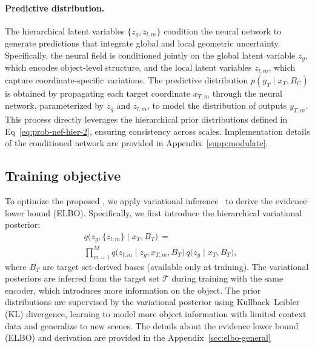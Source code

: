\paragraph{Predictive distribution.}
The hierarchical latent variables \( \{{z}_g, {z}_{l,m}\} \) condition the neural network to generate predictions that integrate global and local geometric uncertainty. Specifically, the neural field is conditioned jointly on the global latent variable \( {z}_g \), which encodes object-level structure, and the local latent variables \( {z}_{l,m} \), which capture coordinate-specific variations. The predictive distribution \( p({y}_T \mid {x}_T, {B}_C) \) is obtained by propagating each target coordinate \( {x}_{T,m} \) through the neural network, parameterized by \( {z}_g \) and \( {z}_{l,m} \), to model the distribution of outputs \( {y}_{T,m} \). This process directly leverages the hierarchical prior distributions defined in Eq~\eqref{eq:prob-nef-hier-2}, ensuring consistency across scales. Implementation details of the conditioned network are provided in Appendix~\ref{supp:modulate}.  

\subsection{Training objective}

To optimize the proposed \name{},
we apply variational inference~\citep{garnelo2018neural} to derive the evidence lower bound (ELBO). Specifically, we first introduce the hierarchical variational posterior:
\begin{equation}
\begin{aligned}
& q\bigl(z_g, \{z_{l,m}\}\mid x_T, B_T\bigr)
\,=\, \\
&\prod_{m=1}^M
q\bigl(z_{l,m} \mid z_g, x_{T,m}, B_T\bigr) \, q\bigl(z_g \mid x_T, B_T\bigr),
\end{aligned}
\end{equation}
where $B_T$ are target set-derived bases (available only at training). The variational posteriors are
inferred from the target set $\mathcal{T}$ during training with the same encoder, which introduces more information on the object. The
prior distributions are supervised by the variational posterior using Kullback–Leibler (KL) divergence,
learning to model more object information with limited context data and generalize to new scenes. The details about the evidence lower bound (ELBO) and derivation are provided in the Appendix~\ref{sec:elbo-general}

